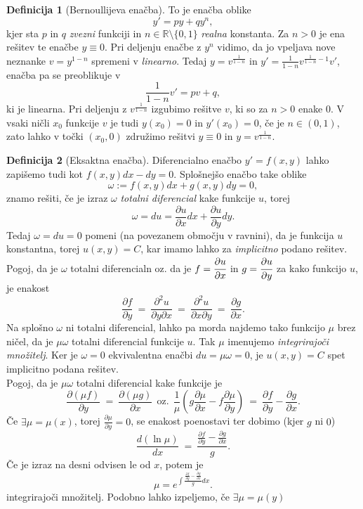 \documentclass[11pt]{article}
\theoremstyle{definition}
\newtheorem{definicija}{Definicija}[section]
\theoremstyle{definition}
\theoremstyle{definition}
\begin{document}
\begin{definicija}[Bernoullijeva enačba]

To je enačba oblike
$$y' = py + qy^n,$$
kjer sta $p$ in $q$ \textit{zvezni} funkciji in $n \in \mathbb{R} \setminus \{0,1\}$ \textit{realna} konstanta. Za $n > 0$ je ena rešitev te enačbe $y \equiv 0$. Pri deljenju enačbe z $y^n$ vidimo, da jo vpeljava nove neznanke $v = y^{1-n}$ spremeni v \textit{linearno}. Tedaj $y = v^{\frac{1}{1-n}}$ in $y' = \frac{1}{1-n} v^{\frac{1}{1-n}-1} v'$, enačba pa se preoblikuje v
$$\frac{1}{1-n} v' = pv + q,$$
ki je linearna. Pri deljenju z $v^{\frac{1}{1-n}}$ izgubimo rešitve $v$, ki so za $n>0$ enake $0$. V vsaki ničli $x_0$ funkcije $v$ je tudi $y(x_0) = 0$ in $y'(x_0) = 0$, če je $n \in (0,1)$, zato lahko v točki $(x_0,0)$ združimo rešitvi $y \equiv 0$ in $y = v^{\frac{1}{1-n}}$.

\end{definicija}
\vspace{0.5cm}

\begin{definicija}[Eksaktna enačba]

Diferencialno enačbo $y' = f(x,y)$ lahko zapišemo tudi kot $f(x,y)dx - dy = 0$. Splošnejšo enačbo take oblike
$$\omega := f(x,y)dx + g(x,y)dy = 0,$$
znamo rešiti, če je izraz $\omega$ \textit{totalni diferencial} kake funkcije $u$, torej
$$\omega = du = \frac{\partial u}{\partial x}dx + \frac{\partial u}{\partial y}dy.$$
Tedaj $\omega = du = 0$ pomeni (na povezanem območju v ravnini), da je funkcija $u$ konstantna, torej $u(x, y) = C$, kar imamo lahko za \textit{implicitno} podano rešitev. \\
\noindent Pogoj, da je $\omega$ totalni diferencialn oz. da je $f = \cfrac{\partial u}{\partial x}$ in $g = \cfrac{\partial u}{\partial y}$ za kako funkcijo $u$, je enakost
$$\frac{\partial f}{\partial y} ~=~ \frac{\partial^2 u}{\partial y \partial x} ~=~ \frac{\partial^2 u}{\partial x \partial y} ~=~ \frac{\partial g}{\partial x}.$$ 
Na splošno $\omega$ ni totalni diferencial, lahko pa morda najdemo tako funkcijo $\mu$ brez ničel, da je $\mu \omega$ totalni diferencial funkcije $u$. Tak $\mu$ imenujemo \textit{integrirajoči množitelj}. Ker je $\omega = 0$ ekvivalentna enačbi $du = \mu \omega = 0$, je $u(x, y) = C$ spet implicitno podana rešitev. \\
\noindent Pogoj, da je $\mu \omega$ totalni diferencial kake funkcije je
$$\frac{\partial (\mu f)}{\partial y} ~=~ \frac{\partial (\mu g)}{\partial x} ~~\text{oz.}~~ \frac{1}{\mu} \left( g \frac{\partial \mu}{\partial x} - f \frac{\partial \mu}{\partial y} \right) ~=~ \frac{\partial f}{\partial y} - \frac{\partial g}{\partial x}.$$ 
Če $\exists \mu = \mu(x)$, torej $\frac{\partial \mu}{\partial y} = 0$, se enakost poenostavi ter dobimo (kjer $g$ ni $0$)
$$\frac{d(\ln \mu)}{dx} ~=~ \frac{\frac{\partial f}{\partial y} - \frac{\partial g}{\partial x}}{g}.$$
Če je izraz na desni odvisen le od $x$, potem je 
$$\mu = e^{\int \frac{\frac{\partial f}{\partial y} - \frac{\partial g}{\partial x}}{g} dx}.$$
integrirajoči množitelj. Podobno lahko izpeljemo, če $\exists \mu = \mu(y)$

\end{definicija}
\vspace{0.5cm}
\end{document}

